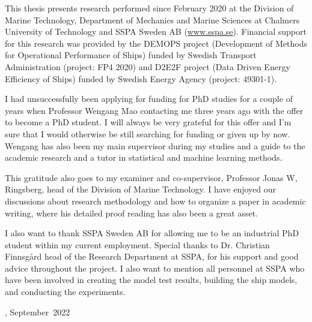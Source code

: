 This thesis presents research performed since February 2020 at the Division of Marine Technology, Department of Mechanics and Marine Sciences at Chalmers University of Technology and SSPA Sweden AB (\href{www.sspa.se}{www.sspa.se}). Financial support for this research was provided by the DEMOPS project (Development of Methods for Operational Performance of Ships) funded by Swedish Transport Administration (project: FP4 2020) and D2E2F project (Data Driven Energy Efficiency of Ships) funded by Swedish Energy Agency (project: 49301-1).

I had unsuccessfully been applying for funding for PhD studies for a couple of years when Professor Wengang Mao contacting me three years ago with the offer to become a PhD student. I will always be very grateful for this offer and I'm sure that I would otherwise be still searching for funding or given up by now. Wengang has also been my main supervisor during my studies and a guide to the academic research and a tutor in statistical and machine learning methods.  

This gratitude also goes to my examiner and co-supervisor, Professor Jonas W, Ringsberg,
head of the Division of Marine Technology. I have enjoyed our discussions about research methodology and how to organize a paper in academic writing, where his detailed proof reading has also been a great asset.

I also want to thank SSPA Sweden AB for allowing me to be an industrial PhD student within my current employment. Special thanks to Dr. Christian Finnsgård head of the Research Department at SSPA, for his support and good advice throughout the project. I also want to mention all personnel at SSPA who have been involved in creating the model test results, building the ship models, and conducting the experiments.

\vskip 2pc

\noindent \thesisauthor

\noindent \thesiscity, September\  2022  %
